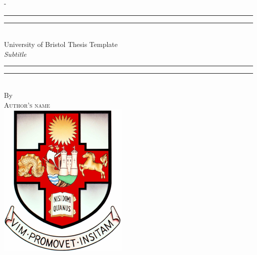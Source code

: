 %
%
% 
%
%
\begin{titlingpage}
   \begin{SingleSpace}
   \calccentering{\unitlength} 
   \begin{adjustwidth*}{\unitlength}{-\unitlength}
   \vspace*{13mm}
   \begin{center}
   \rule[0.5ex]{\linewidth}{2pt}\vspace*{-\baselineskip}\vspace*{3.2pt}
   \rule[0.5ex]{\linewidth}{1pt}\\[\baselineskip]
   {\HUGE University of Bristol Thesis Template }\\[4mm]
   {\Large \textit{Subtitle}}\\
   \rule[0.5ex]{\linewidth}{1pt}\vspace*{-\baselineskip}\vspace{3.2pt}
   \rule[0.5ex]{\linewidth}{2pt}\\
   \vspace{6.5mm}
   {\large By}\\
   \vspace{6.5mm}
   {\large\textsc{Author's name}}\\
   \vspace{11mm}
   \includegraphics[scale=0.6]{logos/bristolcrest_colour}\\

\end{center}
\end{adjustwidth*}
\end{SingleSpace}
\end{titlingpage}
